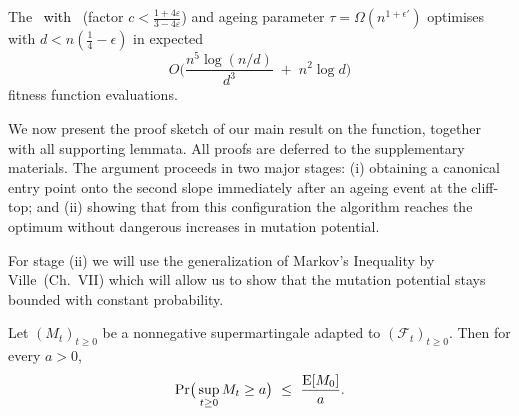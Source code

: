
\begin{theorem}\label{th:expoHD-cliff}
	The %
	\textcolor{black}{\firstBest~with} \linHD\ (factor $c<\tfrac{1+4\varepsilon}{3-4\varepsilon}$) and ageing parameter $\tau=\Omega(n^{1+\epsilon'})$
	optimises \cliff{} with $d<n(\tfrac{1}{4}-\epsilon)$ in expected
	\[
	O\!\Big(\frac{n^{5}\log(n/d)}{d^{3}} \;+\; n^{2}\log d\Big)
	\]
	fitness function evaluations.
\end{theorem}


We now present the proof sketch of our main result on the  \cliff{} function, together with 
all supporting lemmata.  All proofs are deferred to the supplementary materials. 
The argument proceeds in two 
major stages: (i) obtaining a canonical entry point onto the second slope 
immediately after an ageing event at the cliff-top; and (ii) showing that from 
this configuration the algorithm reaches the optimum without dangerous increases in mutation potential.

For stage (ii) we will use the generalization of Markov's Inequality by Ville~\cite{Doob1953}(Ch.~VII) which will allow us to show that the mutation potential stays bounded with constant probability.
\begin{theorem}\label{thm:ville}
	Let $(M_t)_{t\ge 0}$ be a nonnegative supermartingale adapted to $(\mathcal F_t)_{t\ge 0}$. 
	Then for every $a>0$,
	\[
	\Pr\!\big(\sup_{t\ge 0} M_t \ge a\big)\ \le\ \frac{\EE[M_0]}{a}.
	\]
\end{theorem}



